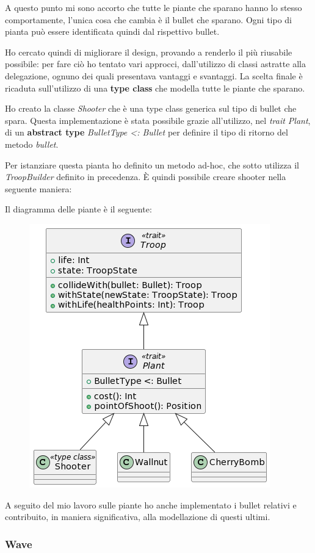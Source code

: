 A questo punto mi sono accorto che tutte le piante che sparano hanno lo stesso comportamente, l'unica cosa che cambia è il bullet che sparano. Ogni tipo di pianta può essere identificata quindi dal rispettivo bullet.

Ho cercato quindi di migliorare il design, provando a renderlo il più riusabile possibile: per fare ciò ho tentato vari approcci, dall'utilizzo di classi astratte alla delegazione, ognuno dei quali presentava vantaggi e svantaggi. La scelta finale è ricaduta sull'utilizzo di una \textbf{type class} che modella tutte le piante che sparano.

Ho creato la classe \textit{Shooter} che è una type class generica sul tipo di bullet che spara. Questa implementazione è stata possibile grazie all'utilizzo, nel \textit{trait Plant}, di un \textbf{abstract type} \textit{BulletType \textless: Bullet} per definire il tipo di ritorno del metodo \textit{bullet}.



Per istanziare questa pianta ho definito un metodo ad-hoc, che sotto utilizza il \textit{TroopBuilder} definito in precedenza. È quindi possibile creare shooter nella seguente maniera:



Il diagramma delle piante è il seguente:

\begin{figure}[H]
    \centering
    \includegraphics[width=0.8\linewidth]{images/plants.png}
    \label{Diagramma delle classi delle piante.}
\end{figure}

A seguito del mio lavoro sulle piante ho anche implementato i bullet relativi e contribuito, in maniera significativa, alla modellazione di questi ultimi.

\subsubsection{Wave}